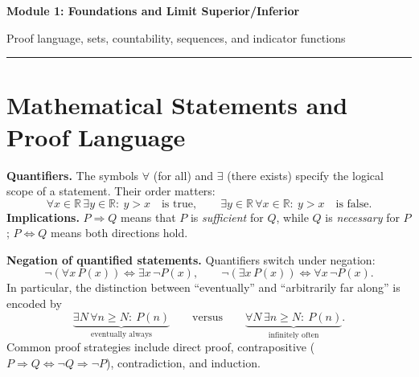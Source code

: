 \documentclass[10pt,a4paper]{article}
\newcommand{\R}{\mathbb R}
\begin{document}
\begin{center}
  {\LARGE\bfseries Module 1: Foundations and Limit Superior/Inferior}\par
  \vspace{5pt}
  {\small\color{muted}Proof language, sets, countability, sequences, and indicator functions}\par
  \vspace{7pt}
  {\color{accent}\rule{0.88\linewidth}{0.7pt}}
\end{center}
\vspace{-4pt}

\section{Mathematical Statements and Proof Language}
\textbf{Quantifiers.} The symbols $\forall$ (for all) and $\exists$ (there exists) specify the logical scope of a statement. Their order matters:
\[
\forall x\in\R\,\exists y\in\R:\ y>x \quad\text{is true},
\qquad
\exists y\in\R\,\forall x\in\R:\ y>x \quad\text{is false}.
\]
\textbf{Implications.} $P\Rightarrow Q$ means that $P$ is \emph{sufficient} for $Q$, while $Q$ is \emph{necessary} for $P$; $P\Leftrightarrow Q$ means both directions hold.

\textbf{Negation of quantified statements.} Quantifiers switch under negation:
\[
\neg(\forall x\,P(x))\iff\exists x\,\neg P(x),\qquad
\neg(\exists x\,P(x))\iff\forall x\,\neg P(x).
\]
In particular, the distinction between ``eventually'' and ``arbitrarily far along'' is encoded by
\[
\underbrace{\exists N\,\forall n\ge N:\ P(n)}_{\text{eventually always}}
\qquad\text{versus}\qquad
\underbrace{\forall N\,\exists n\ge N:\ P(n)}_{\text{infinitely often}}.
\]
Common proof strategies include direct proof, contrapositive ($P\Rightarrow Q\iff\neg Q\Rightarrow\neg P$), contradiction, and induction.
\end{document}
